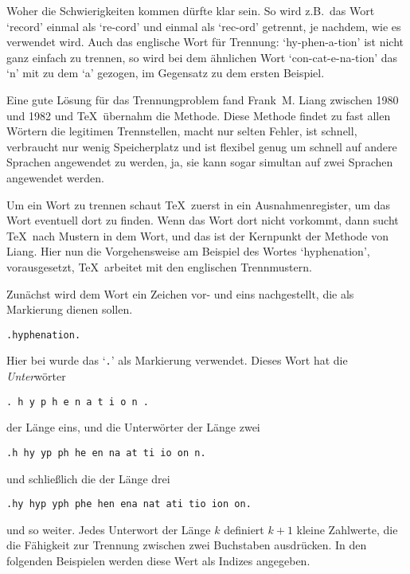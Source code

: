 \begin{appendix}
Woher die Schwierigkeiten kommen d\"urfte klar sein. So wird z.B.\ das
Wort `record' einmal als `re-cord' und einmal als `rec-ord' getrennt,
je nachdem, wie es verwendet wird. Auch das englische Wort f\"ur
Trennung: `hy-phen-a-tion' ist nicht ganz einfach zu trennen, so wird
bei dem \"ahnlichen Wort `con-cat-e-na-tion' das `n' mit zu dem `a'
gezogen, im Gegensatz zu dem ersten Beispiel.

Eine gute L\"osung f\"ur das Trennungproblem fand 
Frank~M. Liang zwischen
1980 und 1982 und \TeX\ \"ubernahm die Methode. Diese Methode findet zu
fast allen W\"ortern die legitimen Trennstellen, macht nur selten
Fehler, ist schnell, verbraucht nur wenig
Speicherplatz und ist
flexibel genug um schnell auf andere Sprachen angewendet zu werden,
ja, sie kann sogar simultan auf zwei Sprachen angewendet werden.

Um ein Wort zu trennen schaut \TeX\ zuerst in ein
Ausnahmenregister,
um das Wort eventuell dort zu finden. Wenn das Wort dort nicht
vorkommt, dann sucht \TeX\ nach 
Mustern in dem Wort, und das ist der
Kernpunkt der Methode von Liang. Hier nun die Vorgehensweise am
Beispiel des Wortes 
`hyphenation', vorausgesetzt, \TeX\ arbeitet mit
den englischen Trennmustern.

Zun\"achst wird dem Wort ein Zeichen vor- und eins nachgestellt, die als
Markierung dienen sollen.
\begin{verbatim}
.hyphenation.
\end{verbatim}
Hier bei wurde das `\verb|.|' als Markierung verwendet. Dieses Wort
hat die {\em Unter}w\"orter
\begin{verbatim}
. h y p h e n a t i o n .
\end{verbatim}
der L\"ange eins, und die Unterw\"orter der L\"ange zwei
\begin{verbatim}
.h hy yp ph he en na at ti io on n.
\end{verbatim}
und schlie\ss{}lich die der L\"ange drei
\begin{verbatim}
.hy hyp yph phe hen ena nat ati tio ion on.
\end{verbatim}
und so weiter. Jedes Unterwort der L\"ange $k$ definiert $k+1$ kleine
Zahlwerte, die die F\"ahigkeit zur Trennung zwischen zwei Buchstaben
ausdr\"ucken. In den folgenden Beispielen werden diese Wert als Indizes
angegeben.
\newcommand{\ti}[1]{${}_#1$}


\end{appendix}

